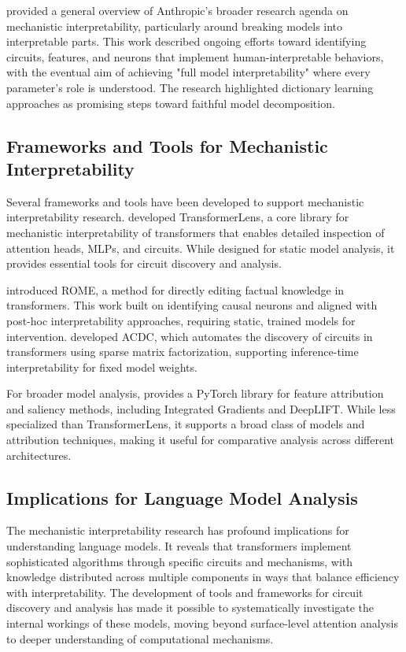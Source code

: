 \citet{anthropic2023components} provided a general overview of Anthropic's broader research agenda on mechanistic interpretability, particularly around breaking models into interpretable parts. This work described ongoing efforts toward identifying circuits, features, and neurons that implement human-interpretable behaviors, with the eventual aim of achieving "full model interpretability" where every parameter's role is understood. The research highlighted dictionary learning approaches as promising steps toward faithful model decomposition.

\subsection{Frameworks and Tools for Mechanistic Interpretability}

Several frameworks and tools have been developed to support mechanistic interpretability research. \citet{nanda2022transformerlens} developed TransformerLens, a core library for mechanistic interpretability of transformers that enables detailed inspection of attention heads, MLPs, and circuits. While designed for static model analysis, it provides essential tools for circuit discovery and analysis.

\citet{meng2022locating} introduced ROME, a method for directly editing factual knowledge in transformers. This work built on identifying causal neurons and aligned with post-hoc interpretability approaches, requiring static, trained models for intervention. \citet{conmy2023towards} developed ACDC, which automates the discovery of circuits in transformers using sparse matrix factorization, supporting inference-time interpretability for fixed model weights.

For broader model analysis, \citet{kokhlikyan2020captum} provides a PyTorch library for feature attribution and saliency methods, including Integrated Gradients and DeepLIFT. While less specialized than TransformerLens, it supports a broad class of models and attribution techniques, making it useful for comparative analysis across different architectures.

\subsection{Implications for Language Model Analysis}

The mechanistic interpretability research has profound implications for understanding language models. It reveals that transformers implement sophisticated algorithms through specific circuits and mechanisms, with knowledge distributed across multiple components in ways that balance efficiency with interpretability. The development of tools and frameworks for circuit discovery and analysis has made it possible to systematically investigate the internal workings of these models, moving beyond surface-level attention analysis to deeper understanding of computational mechanisms.

